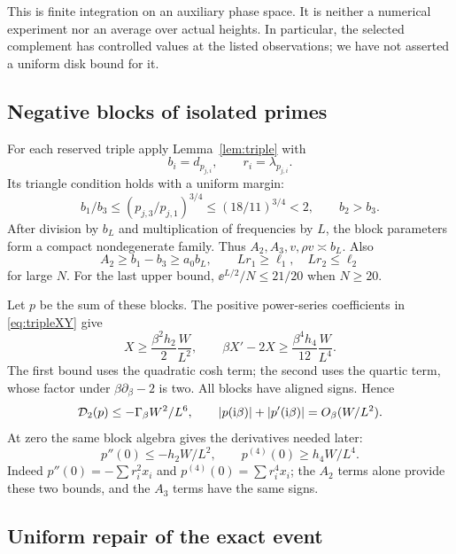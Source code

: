 This is finite integration on an auxiliary phase space. It is neither
a numerical experiment nor an average over actual heights. In
particular, the selected complement has controlled values at the
listed observations; we have not asserted a uniform disk bound for it.

\subsection{Negative blocks of isolated primes}

For each reserved triple apply Lemma~\ref{lem:triple} with
\[
 b_i=d_{p_{j,i}},\qquad r_i=\lambda_{p_{j,i}}.
\]
Its triangle condition holds with a uniform margin:
\[
 b_1/b_3\le(p_{j,3}/p_{j,1})^{3/4}\le(18/11)^{3/4}<2,
 \qquad b_2>b_3.
\]
After division by \(b_L\) and multiplication of frequencies by \(L\),
the block parameters form a compact nondegenerate family. Thus
\(A_2,A_3,v,\rho v\asymp b_L\).
Also
\[
 A_2\ge b_1-b_3\ge a_0b_L,\qquad
 Lr_1\ge\ell_1,\quad Lr_2\le\ell_2
\]
for large \(N\). For the last upper bound,
\(\ee^{L/2}/N\le21/20\) when \(N\ge20\).

Let \(p\) be the sum of these blocks. The positive power-series
coefficients in \eqref{eq:tripleXY} give
\begin{equation}\label{eq:primeXG}
 X\ge\frac{\beta^2h_2}{2}\frac W{L^2},\qquad
 \beta X'-2X\ge\frac{\beta^4h_4}{12}\frac W{L^4}.
\end{equation}
The first bound uses the quadratic cosh term; the second uses the
quartic term, whose factor under \(\beta\partial_\beta-2\) is two.
All blocks have aligned signs. Hence
\begin{equation}\label{eq:primeD}
 \mathcal D_2(p)\le-\Gamma_\beta W^2/L^6,\qquad
 |p(\mathrm i\beta)|+|p'(\mathrm i\beta)|=O_\beta(W/L^2).
\end{equation}
At zero the same block algebra gives the derivatives needed later:
\begin{equation}\label{eq:primejets}
 p''(0)\le-h_2W/L^2,\qquad
 p^{(4)}(0)\ge h_4W/L^4.
\end{equation}
Indeed \(p''(0)=-\sum r_i^2x_i\) and
\(p^{(4)}(0)=\sum r_i^4x_i\); the \(A_2\) terms alone provide these
two bounds, and the \(A_3\) terms have the same signs.

\subsection{Uniform repair of the exact event}

